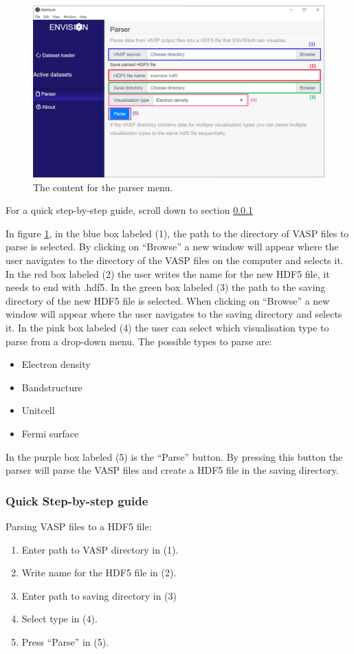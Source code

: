 \begin{figure}[H]
    \centering
    \includegraphics[scale = 0.45]{Images/GUI_Parserstart.png}
    \caption{The content for the parser menu.}
    \label{fig:GUIParser}
\end{figure}

For a quick step-by-step guide, scroll down to section \ref{sec:Parse step-by-step} 

In figure \ref{fig:GUIParser}, in the blue box labeled (1), the path to the directory of VASP files to parse is selected. By clicking on ``Browse'' a new window will appear where the user navigates to the directory of the VASP files on the computer and selects it. In the red box labeled (2) the user writes the name for the new HDF5 file, it needs to end with .hdf5. In the green box labeled (3) the path to the saving directory of the new HDF5 file is selected. When clicking on ``Browse'' a new window will appear where the user navigates to the saving directory and selects it. In the pink box labeled (4) the user can select which visualisation type to parse from a drop-down menu. The possible types to parse are:

\begin{itemize}
    \item Electron density
    \item Bandstructure
    \item Unitcell
    \item Fermi surface
\end{itemize}

In the purple box labeled (5) is the ``Parse'' button. By pressing this button the parser will parse the VASP files and create a HDF5 file in the saving directory. 

\subsubsection{Quick Step-by-step guide}
\label{sec:Parse step-by-step}
Parsing VASP files to a HDF5 file:
\begin{enumerate}
    \item Enter path to VASP directory in (1).
    \item Write name for the HDF5 file in (2).
    \item Enter path to saving directory in (3)
    \item Select type in (4).
    \item Press ``Parse'' in (5).
\end{enumerate}


